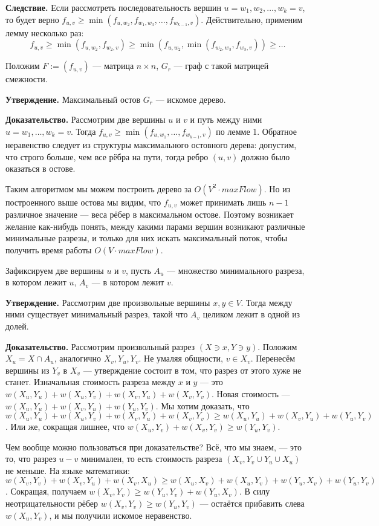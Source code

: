 \textbf{Следствие.} Если рассмотреть последовательность вершин $u = w_1, w_2, \dots, w_k = v$, то будет верно $f_{u,v} \ge \min(f_{u,w_2}, f_{w_1,w_3}, \dots, f_{w_{k-1},v})$.
Действительно, применим лемму несколько раз:
\[
    f_{u,v} \ge \min(f_{u, w_2}, f_{w_2, v}) \ge \min(f_{u, w_2}, \min(f_{w_2, w_3}, f_{w_3, v})) \ge \dots
\]

Положим $F := (f_{u,v})$ --- матрица $n \times n$, $G_r$ --- граф с такой матрицей смежности.

\textbf{Утверждение.} Максимальный остов $G_r$ --- искомое дерево.

\textbf{Доказательство.} Рассмотрим две вершины $u$ и $v$ и путь между ними $u = w_1, \dots, w_k = v$.
Тогда $f_{u,v} \ge \min(f_{u,w_1}, \dots, f_{w_{k-1},v})$ по лемме 1.
Обратное неравенство следует из структуры максимального остовного дерева: допустим, что строго больше, чем все рёбра на пути, тогда ребро $(u, v)$ должно было оказаться в остове.

Таким алгоритмом мы можем построить дерево за $O(V^2 \cdot maxFlow)$.
Но из построенного выше остова мы видим, что $f_{u,v}$ может принимать лишь $n - 1$ различное значение --- веса рёбер в максимальном остове.
Поэтому возникает желание как-нибудь понять, между какими парами вершин возникают различные минимальные разрезы, и только для них искать максимальный поток, чтобы получить время работы $O(V \cdot maxFlow)$.

Зафиксируем две вершины $u$ и $v$, пусть $A_u$ --- множество минимального разреза, в котором лежит $u$, $A_v$ --- в котором лежит $v$.

\textbf{Утверждение.} Рассмотрим две произвольные вершины $x, y \in V$. 
Тогда между ними существует минимальный разрез, такой что $A_v$ целиком лежит в одной из долей.

\textbf{Доказательство.} Рассмотрим произвольный разрез $(X \ni x, Y \ni y)$.
Положим $X_u = X \cap A_u$, аналогично $X_v, Y_u, Y_v$.
Не умаляя общности, $v \in X_v$.
Перенесём вершины из $Y_v$ в $X_v$ --- утверждение состоит в том, что разрез от этого хуже не станет.
Изначальная стоимость разреза между $x$ и $y$ --- это $w(X_u, Y_u) + w(X_u, Y_v) + w(X_v, Y_u) + w(X_v, Y_v)$.
Новая стоимость --- $w(X_u, Y_u) + w(X_v, Y_u) + w(Y_u, Y_v)$.
Мы хотим доказать, что $w(X_u, Y_u) + w(X_u, Y_v) + w(X_v, Y_u) + w(X_v, Y_v) \ge w(X_u, Y_u) + w(X_v, Y_u) + w(Y_u, Y_v)$.
Или же, сокращая лишнее, что $w(X_u, Y_v) + w(X_v, Y_v) \ge w(Y_u, Y_v)$.

Чем вообще можно пользоваться при доказательстве? 
Всё, что мы знаем, --- это то, что разрез $u-v$ минимален, то есть стоимость разреза $(X_v, Y_v \cup Y_u \cup X_u)$ не меньше.
На языке математики: $w(X_v, Y_v) + w(X_v, Y_u) + w(X_v, X_u) \ge w(X_u, X_v) + w(X_u, Y_v) + w(Y_u, X_v) + w(Y_u, Y_v)$.
Сокращая, получаем $w(X_v, Y_v) \ge w(Y_u, Y_v) + w(Y_u, X_v)$.
В силу неотрицательности рёбер $w(X_v, Y_v) \ge w(Y_u, Y_v)$ --- остаётся прибавить слева $w(X_u, Y_v)$, и мы получили искомое неравенство.

